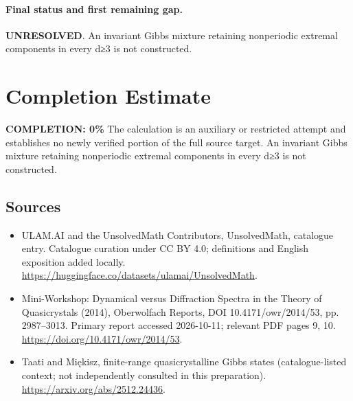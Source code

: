 \documentclass[11pt]{article}
\begin{document}
\paragraph{Final status and first remaining gap.}
\textbf{UNRESOLVED}. An invariant Gibbs mixture retaining nonperiodic extremal components in every d≥3 is not constructed.

\section{Completion Estimate}
\noindent\textbf{COMPLETION: 0\%}
The calculation is an auxiliary or restricted attempt and establishes no newly verified portion of the full source target. An invariant Gibbs mixture retaining nonperiodic extremal components in every d≥3 is not constructed.

\subsection{Sources}
\begin{itemize}
\item[\hypertarget{source:statement:1}{S1}] ULAM.AI and the UnsolvedMath Contributors, UnsolvedMath, catalogue entry. Catalogue curation under CC BY 4.0; definitions and English exposition added locally.
\url{https://huggingface.co/datasets/ulamai/UnsolvedMath}.
\item[\hypertarget{source:statement:2}{S2}] Mini-Workshop: Dynamical versus Diffraction Spectra in the Theory of Quasicrystals (2014), Oberwolfach Reports, DOI 10.4171/owr/2014/53, pp. 2987--3013. Primary report accessed 2026-10-11; relevant PDF pages 9, 10.
\url{https://doi.org/10.4171/owr/2014/53}.
\item[\hypertarget{source:statement:3}{S3}] Taati and Miękisz, finite-range quasicrystalline Gibbs states (catalogue-listed context; not independently consulted in this preparation).
\url{https://arxiv.org/abs/2512.24436}.
\end{itemize}
\label{end:statement}
\end{document}
